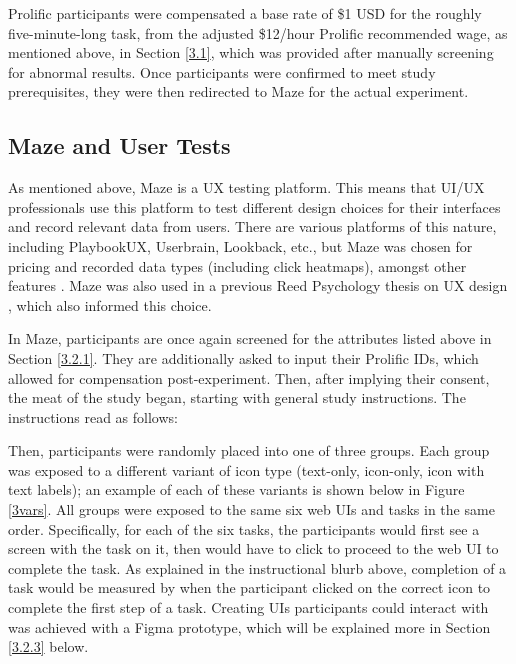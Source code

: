 \documentclass[12pt,twoside]{reedthesis}
\begin{document}
    Prolific participants were compensated a base rate of \$1 USD for the roughly five-minute-long task, from the adjusted \$12/hour Prolific recommended wage, as mentioned above, in Section \ref{3.1}, which was provided after manually screening for abnormal results. Once participants were confirmed to meet study prerequisites, they were then redirected to Maze for the actual experiment.

\subsection{Maze and User Tests}\label{3.2.2}
    As mentioned above, Maze is a UX testing platform. This means that UI/UX professionals use this platform to test different design choices for their interfaces and record relevant data from users. There are various platforms of this nature, including PlaybookUX, Userbrain, Lookback, etc., but Maze was chosen for pricing and recorded data types (including click heatmaps), amongst other features \cite{unmoderated_user-testing_tools-nng_nodate}. Maze was also used in a previous Reed Psychology thesis on UX design \cite{bec_psychology_2023}, which also informed this choice.

    In Maze, participants are once again screened for the attributes listed above in Section \ref{3.2.1}. They are additionally asked to input their Prolific IDs, which allowed for compensation post-experiment. Then, after implying their consent, the meat of the study began, starting with general study instructions. The instructions read as follows: \\

    \noindent{}
    \bigbreak

    Then, participants were randomly placed into one of three groups. Each group was exposed to a different variant of icon type (text-only, icon-only, icon with text labels); an example of each of these variants is shown below in Figure \ref{3vars}. All groups were exposed to the same six web UIs and tasks in the same order. Specifically, for each of the six tasks, the participants would first see a screen with the task on it, then would have to click to proceed to the web UI to complete the task. As explained in the instructional blurb above, completion of a task would be measured by when the participant clicked on the correct icon to complete the first step of a task. Creating UIs participants could interact with was achieved with a Figma prototype, which will be explained more in Section \ref{3.2.3} below. 
    
\end{document}
